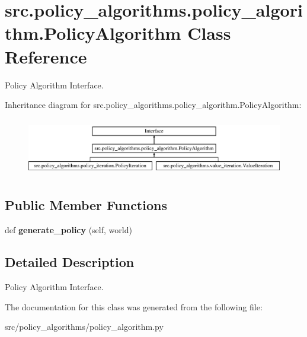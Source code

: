 \hypertarget{classsrc_1_1policy__algorithms_1_1policy__algorithm_1_1_policy_algorithm}{}\section{src.\+policy\+\_\+algorithms.\+policy\+\_\+algorithm.\+Policy\+Algorithm Class Reference}
\label{classsrc_1_1policy__algorithms_1_1policy__algorithm_1_1_policy_algorithm}


Policy Algorithm Interface.  


Inheritance diagram for src.\+policy\+\_\+algorithms.\+policy\+\_\+algorithm.\+Policy\+Algorithm\+:\begin{figure}[H]
\begin{center}
\leavevmode
\includegraphics[height=2.560976cm]{classsrc_1_1policy__algorithms_1_1policy__algorithm_1_1_policy_algorithm}
\end{center}
\end{figure}
\subsection*{Public Member Functions}
\begin{DoxyCompactItemize}
\item 
\mbox{\label{classsrc_1_1policy__algorithms_1_1policy__algorithm_1_1_policy_algorithm_a54e71e409c15ddf266dffceb4773e30b}} 
def {\bfseries generate\+\_\+policy} (self, world)
\end{DoxyCompactItemize}


\subsection{Detailed Description}
Policy Algorithm Interface. 

The documentation for this class was generated from the following file\+:\begin{DoxyCompactItemize}
\item 
src/policy\+\_\+algorithms/policy\+\_\+algorithm.\+py\end{DoxyCompactItemize}
